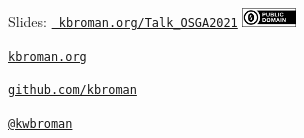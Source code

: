 \documentclass[12pt,t,aspectratio=169]{beamer}
\begin{document}
\begin{frame}[c]{}

\Large

Slides: \href{https://kbroman.org/Talk_OSGA2021}{\tt
  kbroman.org/Talk\_OSGA2021} \quad
\includegraphics[height=5mm]{Figs/cc-zero.png}

\vspace{7mm}

\href{https://kbroman.org}{\tt \lolit kbroman.org}

\vspace{7mm}

\href{https://github.com/kbroman}{\tt \lolit github.com/kbroman}

\vspace{7mm}

\href{https://twitter.com/kwbroman}{\tt \lolit @kwbroman}


\end{frame}
\end{document}
